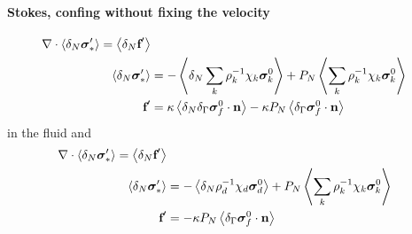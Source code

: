 \documentclass[12pt]{My_preprint}
\begin{document}
\paragraph{Stokes, confing without fixing the velocity}
\begin{align}
    \mathbf{\nabla}\cdot \left<\delta_N \bm\sigma_*'\right> 
    = \left<\delta_N \textbf{f}'\right>\\
    \left<\delta_N\bm\sigma_*'\right>
    &=
    -\left<\delta_N\sum_k \rho^{-1}_k \chi_k \bm\sigma_k^0\right>
    + P_N  \left<\sum_k \rho^{-1}_k \chi_k \bm\sigma_k^0  \right>\\
    \textbf{f}'
    &=
    \kappa \left<\delta_N\delta_{\Gamma}  \bm\sigma_f^0 \cdot \textbf{n}\right>
    - \kappa P_N \left<\delta_{\Gamma}  \bm\sigma_f^0 \cdot \textbf{n}\right>
    \\
\end{align}
in the fluid and 
\begin{align}
    \mathbf{\nabla}\cdot \left<\delta_N \bm\sigma_*'\right> 
    = \left<\delta_N \textbf{f}'\right>\\
    \left<\delta_N\bm\sigma_*'\right>
    &=
    -\left<\delta_N \rho^{-1}_d \chi_d \bm\sigma_d^0\right>
    + P_N  \left<\sum_k \rho^{-1}_k \chi_k \bm\sigma_k^0  \right>\\
    \textbf{f}'
    &=
    - \kappa P_N \left<\delta_{\Gamma}  \bm\sigma_f^0 \cdot \textbf{n}\right>
    \\
\end{align}
\end{document}
